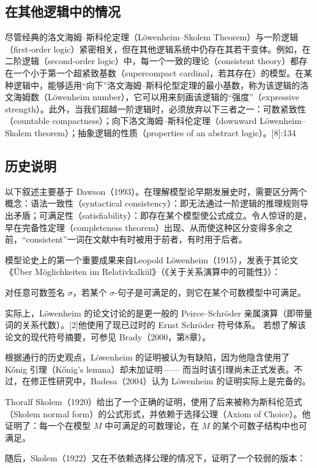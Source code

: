 \subsection{在其他逻辑中的情况}
尽管经典的洛文海姆–斯科伦定理（Löwenheim–Skolem Theorem）与一阶逻辑（first-order logic）紧密相关，但在其他逻辑系统中仍存在其若干变体。例如，在二阶逻辑（second-order logic）中，每一个一致的理论（consistent theory）都存在一个小于第一个超紧致基数（supercompact cardinal，若其存在）的模型。在某种逻辑中，能够适用“向下”洛文海姆–斯科伦型定理的最小基数，称为该逻辑的洛文海姆数（Löwenheim number），它可以用来刻画该逻辑的“强度”（expressive strength）。此外，当我们超越一阶逻辑时，必须放弃以下三者之一：可数紧致性（countable compactness）；向下洛文海姆–斯科伦定理（downward Löwenheim–Skolem theorem）；抽象逻辑的性质（properties of an abstract logic）。[8]:134  
\subsection{历史说明}
以下叙述主要基于 Dawson（1993）。在理解模型论早期发展史时，需要区分两个概念：语法一致性（syntactical consistency）：即无法通过一阶逻辑的推理规则导出矛盾；可满足性（satisfiability）：即存在某个模型使公式成立。令人惊讶的是，早在完备性定理（completeness theorem）出现、从而使这种区分变得多余之前，“consistent”一词在文献中有时被用于前者，有时用于后者。

模型论史上的第一个重要成果来自Leopold Löwenheim（1915），发表于其论文《Über Möglichkeiten im Relativkalkül》（《关于关系演算中的可能性》）：

对任意可数签名 \(\sigma\)，若某个 \(\sigma\)-句子是可满足的，则它在某个可数模型中可满足。

实际上，Löwenheim 的论文讨论的是更一般的 Peirce–Schröder 亲属演算（即带量词的关系代数）。[2]他使用了现已过时的 Ernst Schröder 符号体系。  
若想了解该论文的现代符号摘要，可参见 Brady（2000，第8章）。


根据通行的历史观点，Löwenheim 的证明被认为有缺陷，因为他隐含使用了 Kőnig 引理（Kőnig’s lemma）却未加证明—— 而当时该引理尚未正式发表。不过，在修正性研究中，Badesa（2004）认为 Löwenheim 的证明实际上是完备的。

Thoralf Skolem（1920）给出了一个正确的证明，使用了后来被称为斯科伦范式（Skolem normal form）的公式形式，并依赖于选择公理（Axiom of Choice）。他证明了：每一个在模型 \(M\) 中可满足的可数理论，在 \(M\) 的某个可数子结构中也可满足。

随后，Skolem（1922）又在不依赖选择公理的情况下，证明了一个较弱的版本：

